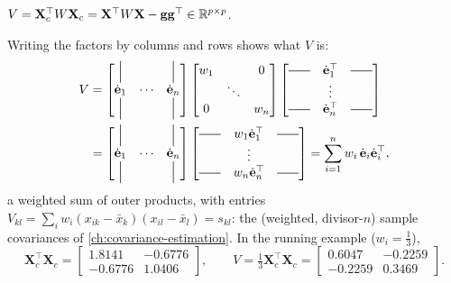 \begin{notechapter}
\begin{definition}
$V = \mathbf X_c^\top W\mathbf X_c = \mathbf X^\top W\mathbf X - \mathbf g\mathbf g^\top\in\mathbb{R}^{p\times p}$.
\end{definition}

Writing the factors by columns and rows shows what $V$ is:
\begin{align*}
  V &=
  \begin{bmatrix}
    \vertbar & & \vertbar\\
    \dot{\mathbf e}_1 & \cdots & \dot{\mathbf e}_n\\
    \vertbar & & \vertbar
  \end{bmatrix}
  \begin{bmatrix}
    w_1 & & 0\\ & \ddots & \\ 0 & & w_n
  \end{bmatrix}
  \begin{bmatrix}
    \horzbar & \dot{\mathbf e}_1^\top & \horzbar\\
     & \vdots & \\
    \horzbar & \dot{\mathbf e}_n^\top & \horzbar
  \end{bmatrix}\\
  &=
  \begin{bmatrix}
    \vertbar & & \vertbar\\
    \dot{\mathbf e}_1 & \cdots & \dot{\mathbf e}_n\\
    \vertbar & & \vertbar
  \end{bmatrix}
  \begin{bmatrix}
    \horzbar & w_1\dot{\mathbf e}_1^\top & \horzbar\\
     & \vdots & \\
    \horzbar & w_n\dot{\mathbf e}_n^\top & \horzbar
  \end{bmatrix}
  = \sum_{i=1}^nw_i\,\dot{\mathbf e}_i\dot{\mathbf e}_i^\top ,
\end{align*}
a weighted sum of outer products, with entries
$V_{kl} = \sum_iw_i(x_{ik} - \bar x_k)(x_{il} - \bar x_l) = s_{kl}$: the (weighted, divisor-$n$)
sample covariances of \cref{ch:covariance-estimation}. In the running example ($w_i = \frac13$),
\[
  \mathbf X_c^\top\mathbf X_c = \begin{bmatrix}1.8141 & -0.6776\\ -0.6776 & 1.0406\end{bmatrix},
  \qquad
  V = \tfrac13\mathbf X_c^\top\mathbf X_c = \begin{bmatrix}0.6047 & -0.2259\\ -0.2259 & 0.3469\end{bmatrix}.
\]


\end{notechapter}
